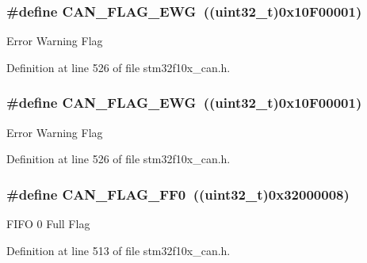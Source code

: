 \subsubsection[{\texorpdfstring{C\+A\+N\+\_\+\+F\+L\+A\+G\+\_\+\+E\+WG}{CAN_FLAG_EWG}}]{\setlength{\rightskip}{0pt plus 5cm}\#define C\+A\+N\+\_\+\+F\+L\+A\+G\+\_\+\+E\+WG~(({\bf uint32\+\_\+t})0x10\+F00001)}\hypertarget{group___c_a_n__flags_gae8906ba9c4031866c5096418ffa9bf71}{}\label{group___c_a_n__flags_gae8906ba9c4031866c5096418ffa9bf71}
Error Warning Flag 

Definition at line 526 of file stm32f10x\+\_\+can.\+h.

\subsubsection[{\texorpdfstring{C\+A\+N\+\_\+\+F\+L\+A\+G\+\_\+\+E\+WG}{CAN_FLAG_EWG}}]{\setlength{\rightskip}{0pt plus 5cm}\#define C\+A\+N\+\_\+\+F\+L\+A\+G\+\_\+\+E\+WG~(({\bf uint32\+\_\+t})0x10\+F00001)}\hypertarget{group___c_a_n__flags_gae8906ba9c4031866c5096418ffa9bf71}{}\label{group___c_a_n__flags_gae8906ba9c4031866c5096418ffa9bf71}
Error Warning Flag 

Definition at line 526 of file stm32f10x\+\_\+can.\+h.

\subsubsection[{\texorpdfstring{C\+A\+N\+\_\+\+F\+L\+A\+G\+\_\+\+F\+F0}{CAN_FLAG_FF0}}]{\setlength{\rightskip}{0pt plus 5cm}\#define C\+A\+N\+\_\+\+F\+L\+A\+G\+\_\+\+F\+F0~(({\bf uint32\+\_\+t})0x32000008)}\hypertarget{group___c_a_n__flags_ga11648741ff43af1561ce7009698fb797}{}\label{group___c_a_n__flags_ga11648741ff43af1561ce7009698fb797}
F\+I\+FO 0 Full Flag 

Definition at line 513 of file stm32f10x\+\_\+can.\+h.

